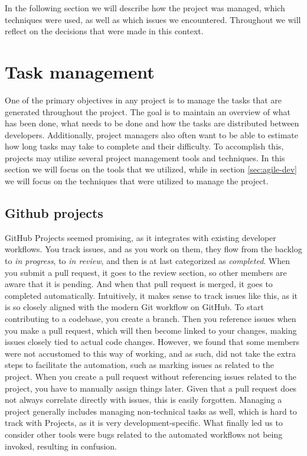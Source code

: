 In the following section we will describe how the project was managed, which techniques were used, as well as which issues we encountered. Throughout we will reflect on the decisions that were made in this context.

\section{Task management}
One of the primary objectives in any project is to manage the tasks that are generated throughout the project. The goal is to maintain an overview of what has been done, what needs to be done and how the tasks are distributed between developers. Additionally, project managers also often want to be able to estimate how long tasks may take to complete and their difficulty. To accomplish this, projects may utilize several project management tools and techniques. In this section we will focus on the tools that we utilized, while in section \ref{sec:agile-dev} we will focus on the techniques that were utilized to manage the project.

\subsection{Github projects}
GitHub Projects seemed promising, as it integrates with existing developer workflows. You track issues, and as you work on them, they flow from the backlog to \textit{in progress}, to \textit{in review}, and then is at last categorized as \textit{completed}. When you submit a pull request, it goes to the review section, so other members are aware that it is pending. And when that pull request is merged, it goes to completed automatically.
Intuitively, it makes sense to track issues like this, as it is so closely aligned with the modern Git workflow on GitHub. To start contributing to a codebase, you create a branch. Then you reference issues when you make a pull request, which will then become linked to your changes, making issues closely tied to actual code changes.
However, we found that some members were not accustomed to this way of working, and as such, did not take the extra steps to facilitate the automation, such as marking issues as related to the project.
When you create a pull request without referencing issues related to the project, you have to manually assign things later. Given that a pull request does not always correlate directly with issues, this is easily forgotten.
Managing a project generally includes managing non-technical tasks as well, which is hard to track with Projects, as it is very development-specific.
What finally led us to consider other tools were bugs related to the automated workflows not being invoked, resulting in confusion.

